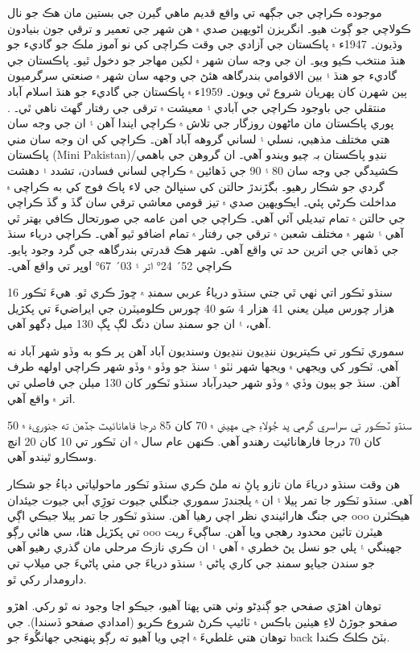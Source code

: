 \documentclass[a4paper]{article}
\begin{document}
\begin{flushright}
موجوده ڪراچي جي جڳهه تي واقع قديم ماهي گيرن جي بستين مان هڪ جو نال ڪولاچي جو ڳوٺ هيو۔ انگريزن اڻويهين صدي ۾ هن شهر جي تعمير و ترقي جون بنيادون وڌيون۔ 1947ء ۾ پاڪستان جي آزادي جي وقت ڪراچی کي نو آموز ملڪ جو گاديء جو هنڌ منتخب ڪيو ويو۔ ان جي وجه سان شهر ۾ لکين مهاجر جو دخول ٿيو۔ پاڪستان جي گاديء جو هنڌ ۽ بين الاقوامي بندرگاهه هئڻ جي وجهه سان شهر ۾ صنعتي سرگرميون ٻين شهرن کان پهريان شروع ٿي ويون۔ 1959ء ۾ پاڪستان جي گاديء جو هنڌ اسلام آباد منتقلي جي باوجود ڪراچي جي آبادي ۽ معيشت ۾ ترقی جي رفتار گهٽ ناهي ٿي۔ . پوري پاڪستان مان ماڻهون روزگار جي تلاش ۾ ڪراچي ايندا آهن ۽ ان جي وجه سان هتي مختلف مذهبي، نسلي ۽ لساني گروهه آباد آهن۔ ڪراچي کي ان وجه سان مني پاڪستان (Mini Pakistan)/ننڍو پاڪستان بہ چيو ويندو آهي۔ ان گروهن جي باهمي ڪشيدگي جي وجه سان 80 ۽ 90 جي ڏهائين ۾ ڪراچي لساني فسادن، تشدد ۽ دهشت گردي جو شڪار رهيو۔ بگڙندڙ حالتن کي سنڀالڻ جي لاء پاڪ فوج کي به ڪراچی ۾ مداخلت ڪرڻي پئي۔ ايڪويهين صدي ۾ تيز قومي معاشي ترقي سان گڏ و گڏ ڪراچي جي حالتن ۾ تمام تبديلي آئي آهي۔ ڪراچي جي امن عامه جي صورتحال ڪافي بهتر ٿي آهي ۽ شهر ۾ مختلف شعبن ۾ ترقي جي رفتار ۾ تمام اضافو ٿيو آهي۔ ڪراچي درياء سنڌ جي ڏهاني جي اترين حد تي واقع آهي۔ شهر هڪ قدرتي بندرگاهه جي گرد وجود پايو۔ ڪراچي 52´ 24° اتر ۽ 03´ 67° اوڀر تي واقع آهي۔

سنڌو ٽڪور اتي ٺهي ٿي جتي سنڌو درياءُ عربي سمنڊ ۾ ڇوڙ ڪري ٿو. هيءَ ٽڪور 16 هزار چورس ميلن يعني 41 هزار 4 سَو 40 چورس ڪلوميٽرن جي ايراضيءَ تي پکڙيل آهي، ۽ ان جو سمنڊ سان دنگ لڳ ڀڳ 130 ميل ڊگھو آهي.

سموري ٽڪور تي ڪيتريون ننڍيون ننڍيون وسنديون آباد آهن پر ڪو به وڏو شهر آباد نه آهي. ٽڪور کي ويجھي ۾ ويجھا شهر ٺٽو ۽ سنڌ جو وڏو ۾ وڏو شهر ڪراچي اولهه طرف آهن. سنڌ جو ٻيون وڏي ۾ وڏو شهر حيدرآباد سنڌو ٽڪور کان 130 ميلن جي فاصلي تي اتر ۾ واقع آهي.

سنڌو ٽڪور تي سراسري گرمي پد جُولاءِ جي مهيني ۾ 70 کان 85 درجا فاهانائيٽ جڏهن ته جنوريءَ ۾ 50 کان 70 درجا فارهانائيٽ رهندو آهي. ڪنهن عام سال ۾ ان ٽڪور تي 10 کان 20 انچ وسڪارو ٿيندو آهي.

هن وقت سنڌو درياءَ مان تازو پاڻِ نه ملڻ ڪري سنڌو ٽڪور ماحولياتي دٻاءُ جو شڪار آهي. سنڌو ٽڪور جا تمر ٻيلا ۽ ان ۾ پلجندڙ سموري جنگلي جيوت توڙِي آبي جيوت جيئدان جي جنگ هارائيندي نظر اچي رهيا آهن. سنڌو ٽڪور جا تمر ٻيلا جيڪي اڳي ooo هيڪٽرن تي پکڙيل هئا، سي هائي رڳو ooo هيٽرن تائين محدود رهجي ويا آهن. ساڳيءَ ريت جھينگي ۽ پلي جو نسل پڻ خطري ۾ آهي ۽ ان ڪري نازڪ مرحلي مان گذري رهيو آهي جو سندن جياپو سمنڊ جي کاري پاڻي ۽ سنڌو درياءَ جي مٺي پاڻيءَ جي ميلاپ تي دارومدار رکي ٿو.

توهان اهڙي صفحي جو ڳنڍڻو وٺي هتي پهتا آهيو، جيڪو اڃا وجود نه ٿو رکي. اهڙو صفحو جوڙڻ لاءِ هيٺين باڪس ۾ ٽائيپ ڪرڻ شروع ڪريو (امدادي صفحو ڏسندا). جي توهان هتي غلطيءَ ۾ اچي ويا آهيو ته رڳو پنهنجي جهانگُوءَ جو back بٽڻ ڪلڪ ڪندا.


\end{flushright}
\end{document}
